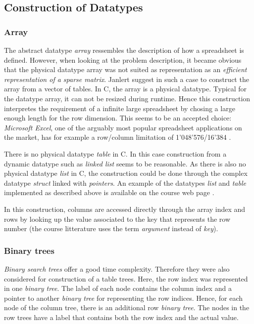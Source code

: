 \documentclass[a4paper,11pt,twoside]{article}
\begin{document}
\subsection{Construction of Datatypes}
\subsubsection{Array}
The abstract datatype \emph{array} ressembles the description of 
how a spreadsheet is defined. However, when looking at the problem 
description, it became obvious that the physical datatype array was 
not suited as representation as an \emph{efficient representation of a
 sparse matrix}. Janlert \cite[pp 101-103]{janlert2000} suggest in
such a case to construct the array from a vector of tables. In C, the
array is a physical datatype. Typical for the datatype array, it can
not be resized during runtime. Hence this construction interpretes the
requirement of a infinite large spreadsheet by chosing a large enough
length for the row dimension. This seems to be an accepted choice:
\textit{Microsoft Excel}, one of the arguably most popular spreadsheet
applications on the market, has for example a row/column limitation of
1'048'576/16'384 \cite{excel_limit}.

There is no physical datatype \textit{table} in C. In this case construction
from a dynamic datatype such as \textit{linked list} seems to be reasonable. As
there is also no physical datatype \textit{list} in C, the construction could
be done through the complex datatype \textit{struct} linked with
\textit{pointers}. An example of the datatypes \textit{list} and
\textit{table} implemented as described above is available on the course
web page \cite{datatypes}.

In this construction, columns are accessed directly through the array
index and rows by looking up the value associated to the key that
represents the row number (the course litterature uses the term
\textit{argument} instead of \textit{key}\cite{janlert2000}).
 

\subsubsection{Binary trees}
\textit{Binary search trees} offer a good time complexity. Therefore
they were also considered for construction of a table trees. 
Here, the row index was represented in one \textit{binary tree}. The
label of each node contains the column index and a pointer to
another \textit{binary tree} for representing the row indices. 
Hence, for each node of the column tree, there is an additional row
\textit{binary tree}. The nodes in the row trees have a label that
contains both the row index and the actual value. 
\end{document}
